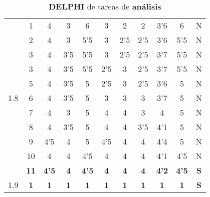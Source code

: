 \documentclass[11pt,a4paper,spanish,twoside]{report}
\begin{document}
\begin{table}[!h]
\begin{tabular}{|c|c||c|c|c|c|c||c|c|c||c|}
    \multirow{11}{*}{1.8} 
    & 1  & 4   & 3   & 6   & 3   & 2   & 2   & 3'6 & 6   & N \\
    & 2  & 4   & 3   & 5'5 & 3   & 2'5 & 2'5 & 3'6 & 5'5 & N \\
    & 3  & 4   & 3'5 & 5'5 & 3   & 2'5 & 2'5 & 3'7 & 5'5 & N \\
    & 3  & 4   & 3'5 & 5'5 & 2'5 & 3   & 2'5 & 3'7 & 5'5 & N \\
    & 5  & 4   & 3'5 & 5   & 2'5 & 3   & 2'5 & 3'6 & 5   & N \\
    & 6  & 4   & 3'5 & 5   & 3   & 3   & 3   & 3'7 & 5   & N \\
    & 7  & 4   & 3   & 5   & 4   & 4   & 3   & 4   & 5   & N \\
    & 8  & 4   & 3'5 & 5   & 4   & 4   & 3'5 & 4'1 & 5   & N \\
    & 9  & 4'5 & 4   & 5   & 4'5 & 4   & 4   & 4'4 & 5   & N \\
    & 10 & 4   & 4   & 4'5 & 4   & 4   & 4   & 4'1 & 4'5 & N \\
    & \textbf{11} & \textbf{4'5} & \textbf{4} & \textbf{4'5} & \textbf{4} &
    \textbf{4} & \textbf{4} & \textbf{4'2} & \textbf{4'5} & \textbf{S} \\ 
    \hline

    1.9 & \textbf{1} & \textbf{1} & \textbf{1} & \textbf{1} &
    \textbf{1} & \textbf{1} & \textbf{1} & \textbf{1} & \textbf{1} &
    \textbf{S} \\
    \hline
  \end{tabular}
  \caption{\textbf{DELPHI} de tareas de \textbf{análisis}} 
  \label{Tab:DELPHIanal}
\end{table}
\end{document}
